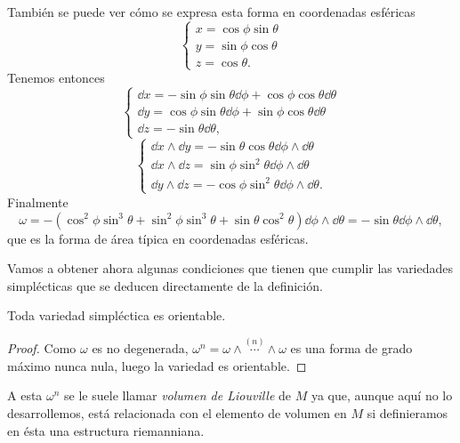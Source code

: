 \begin{ejemplo}
  También se puede ver cómo se expresa esta forma en coordenadas esféricas
  \begin{equation*}
    \begin{cases}
      x=\cos \phi \sin \theta \\
      y= \sin \phi \cos \theta \\
      z=\cos \theta.
    \end{cases}
  \end{equation*}
  Tenemos entonces
  \begin{equation*}
    \begin{cases}
    \dd x = -\sin \phi \sin \theta \dd \phi + \cos \phi \cos \theta \dd \theta \\
    \dd y = \cos \phi \sin \theta \dd \phi + \sin \phi \cos \theta \dd \theta \\
    \dd z= -\sin \theta \dd \theta,
  \end{cases}
  \end{equation*}
  \begin{equation*}
    \begin{cases}
      \dd x \wedge \dd y = -\sin \theta \cos \theta \dd \phi \wedge \dd \theta \\
      \dd x \wedge \dd z = \sin \phi \sin ^2 \theta \dd \phi \wedge \dd \theta \\
      \dd y \wedge \dd z = -\cos \phi \sin ^2 \theta \dd \phi \wedge \dd \theta.
    \end{cases}
  \end{equation*}
  Finalmente
  \begin{equation*}
    \omega = -(\cos^2 \phi \sin ^3 \theta + \sin^2\phi \sin ^3 \theta +\sin \theta \cos^2 \theta) \dd \phi \wedge \dd \theta = -\sin \theta \dd \phi \wedge \dd \theta,
  \end{equation*}
  que es la forma de área típica en coordenadas esféricas.
\end{ejemplo}

Vamos a obtener ahora algunas condiciones que tienen que cumplir las variedades simplécticas que se deducen directamente de la definición.

\begin{prop}
  Toda variedad simpléctica es orientable.
\end{prop}
\begin{proof}
  Como $\omega$ es no degenerada, $\omega^n=\omega \wedge \overset{(n)}{\cdots} \wedge \omega$ es una forma de grado máximo nunca nula, luego la variedad es orientable.
\end{proof}
A esta $\omega^n$ se le suele llamar \emph{volumen de Liouville} de $M$ ya que, aunque aquí no lo desarrollemos, está relacionada con el elemento de volumen en $M$ si definieramos en ésta una estructura riemanniana.

